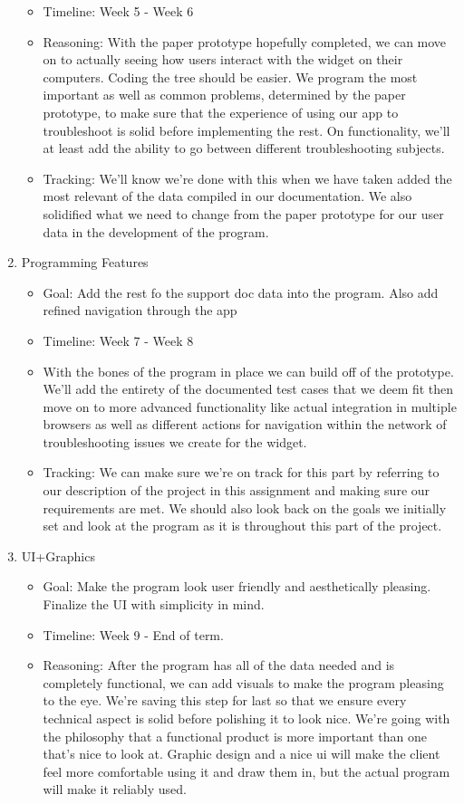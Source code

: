 \documentclass[12pt, letterpaper]{article}
\begin{document}
\begin{enumerate}
\begin{itemize}
		\item Timeline: Week 5 - Week 6
		\item Reasoning: With the paper prototype hopefully completed, we can move on to actually seeing how users interact with the widget on their computers. Coding the tree should be easier. We program the most important as well as common problems, determined by the paper prototype, to make sure that the experience of using our app to troubleshoot is solid before implementing the rest. On functionality, we’ll at least add the ability to go between different troubleshooting subjects.
		\item Tracking: We’ll know we’re done with this when we have taken added the most relevant of the data compiled in our documentation. We also  solidified what we need to change from the paper prototype for our user data in the development of the program.
	\end{itemize}
	\item Programming Features
	\begin{itemize}
		\item Goal: Add the rest fo the support doc data into the program. Also add refined navigation through the app
		\item Timeline: Week 7 - Week 8
		\item With the bones of the program in place we can build off of the prototype. We’ll add the entirety of the documented test cases that we deem fit then move on to more advanced functionality like actual integration in multiple browsers as well as different actions for navigation within the network of troubleshooting issues we create for the widget.
		\item Tracking: We can make sure we’re on track for this part by referring to our description of the project in this assignment and making sure our requirements are met. We should also look back on the goals we initially set and look at the program as it is throughout this part of the project.
	\end{itemize}
	\item UI+Graphics
	\begin{itemize}
		\item Goal: Make the program look user friendly and aesthetically pleasing. Finalize the UI with simplicity in mind. 
		\item Timeline: Week 9 - End of term. 
		\item Reasoning: After the program has all of the data needed and is completely functional, we can add visuals to make the program pleasing to the eye. We’re saving this step for last so that we ensure every technical aspect is solid before polishing it to look nice. We’re going with the philosophy that a functional product is more important than one that’s nice to look at. Graphic design and a nice ui will make the client feel more comfortable using it and draw them in, but the actual program will make it reliably used.

\end{itemize}
\end{enumerate}
\end{document}
